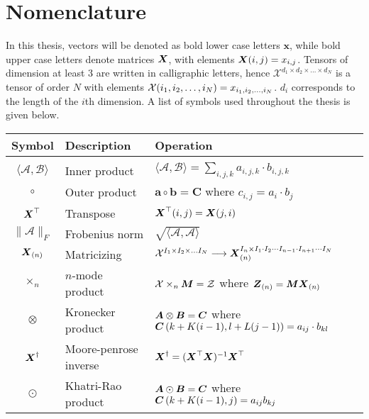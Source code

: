 \section{Nomenclature}

In this thesis, vectors will be denoted as bold lower case letters $\boldsymbol{x}$, while bold upper case letters denote matrices $\boldsymbol{X}$, with elements $\boldsymbol{X}(i, j) = x_{i,j}$. Tensors of dimension at least 3 are written in calligraphic letters, hence $\mathcal{X}^{d_1\times d_2 \times \dots \times d_N}$ is a tensor of order $N$ with elements $\mathcal{X}(i_1, i_2, \dots, i_N) = x_{i_1, i_2, \dots, i_N}$. $d_i$ corresponds to the length of the $i$th dimension. A list of symbols used throughout the thesis is given below. 

\vspace{1cm}

\begin{tabular}{cll}
    \textbf{Symbol} & \textbf{Description} & \textbf{Operation}  \\ \hline
    & & \\
    $\langle \mathcal{A}, \mathcal{B}\rangle$ & Inner product & $\langle \mathcal{A}, \mathcal{B}\rangle = \sum_{i,j,k} a_{i,j,k}\cdot b_{i,j,k}$ \\[2ex]
    $\circ$ &  Outer product & $\boldsymbol{a} \circ \boldsymbol{b} = \boldsymbol{C}$ where $c_{i,j} = a_i \cdot b_j$ \\[2ex]
    $\boldsymbol{X}^{\top}$ & Transpose & $\boldsymbol{X}^{\top}(i,j) = \boldsymbol{X}(j,i)$ \\[2ex]
    $\| \mathcal{A} \|_F$ & Frobenius norm & $\sqrt{\langle \mathcal{A}, \mathcal{A}\rangle}$ \\[2ex]
    $\boldsymbol{X}_{(n)}$ & Matricizing & $\mathcal{X}^{I_1 \times I_2 \times \dots I_N} \longrightarrow \boldsymbol{X}_{(n)}^{I_n \times I_1 \cdot I_2 \cdots I_{n-1} \cdot I_{n+1} \cdots I_N}$ \\[2ex]
    $\times_n$ & $n$-mode product & $\mathcal{X}\times_n \boldsymbol{M} = \mathcal{Z}$ where $\boldsymbol{Z}_{(n)} = \boldsymbol{M}\boldsymbol{X}_{(n)}$ \\[2ex]
    $\otimes$ & Kronecker product & $\boldsymbol{A}\otimes \boldsymbol{B} = \boldsymbol{C}$ where $\boldsymbol{C}\left(k + K(i-1), l + L(j-1)\right) = a_{ij} \cdot b_{kl}$ \\[2ex]
    $\boldsymbol{X}^{\dagger}$ & Moore-penrose inverse & $\boldsymbol{X}^{\dagger} = ( \boldsymbol{X}^\top \boldsymbol{X})^{-1}\boldsymbol{X}^{\top}$ \\[2ex]
    $\odot$ & Khatri-Rao product & $\boldsymbol{A} \odot \boldsymbol{B} = \boldsymbol{C}$ where $\boldsymbol{C}\left(k + K(i-1), j\right) = a_{ij}b_{kj}$
\end{tabular}